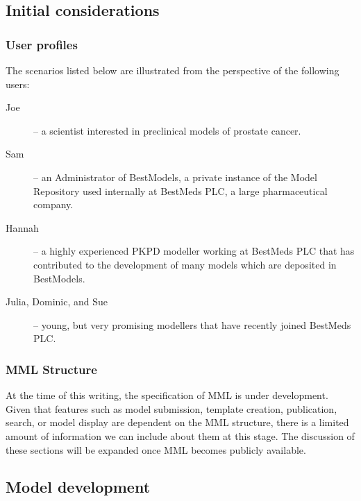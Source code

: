 \subsection{Initial considerations}
\subsubsection{User profiles}
\label{userProfiles}
The scenarios listed below are illustrated from the perspective of the following users:
\begin{description}
    \item[Joe] -- a scientist interested in preclinical models of prostate cancer.
    \item[Sam] -- an Administrator of BestModels, a private instance of the \ddmore Model Repository used internally at BestMeds PLC, a large pharmaceutical company.
    \item[Hannah] -- a highly experienced PKPD modeller working at BestMeds PLC that has contributed to the development of many models which are deposited in BestModels.
    \item[Julia, Dominic, and Sue] -- young, but very promising modellers that have recently joined BestMeds PLC.
\end{description}

\subsubsection{MML Structure}
At the time of this writing, the specification of MML is under development. Given that features such as model submission, template creation, publication, search, or model display are dependent on the MML structure, there is a limited amount of information we can include about them at this stage. The discussion of these sections will be expanded once MML becomes publicly available.

\subsection{Model development}

